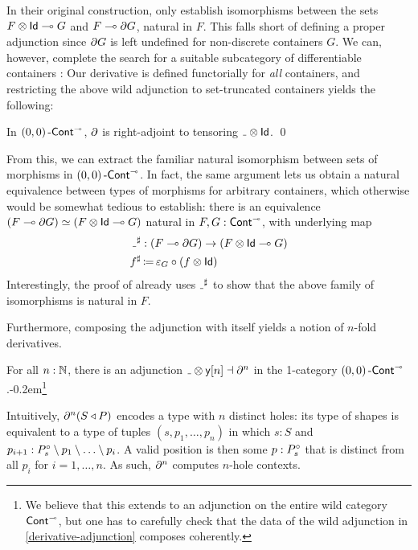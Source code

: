 In their original construction, \citeauthor{AbbottEtAl2005DataDifferentiating} only establish isomorphisms between the sets
\( F \mathbin{\otimes} \mathsf{Id}\mathrel{\multimap}G \) and \( F\mathrel{\multimap}\partial{G} \), natural in \( F \).
This falls short of defining a proper adjunction since \( \partial{G} \) is left undefined for non-discrete containers \( G \).
We can, however, complete the search for a suitable subcategory of differentiable containers \cite[14]{AbbottEtAl2005DataDifferentiating}:
Our derivative is defined functorially for \emph{all} containers,
and restricting the above wild adjunction to set-truncated containers yields the following:
\begin{theorem}\label{derivative-adjunction-sets}
  In \( (0,0)\operatorname{\mathsf{-Cont}}^{{\scriptscriptstyle\multimap}} \), \( \partial \) is right-adjoint to tensoring \( \Blank \CTimes \Id \). \qed
\end{theorem}
From this, we can extract the familiar natural isomorphism between sets of morphisms in \( (0,0)\operatorname{\mathsf{-Cont}}^{{\scriptscriptstyle\multimap}} \).
In fact, the same argument lets us obtain a natural equivalence between types of morphisms for arbitrary containers,
which otherwise would be somewhat tedious to establish:
there is an equivalence \( (F\mathrel{\multimap}\partial{G}) \simeq (F \mathbin{\otimes} \mathsf{Id}\mathrel{\multimap}G) \) natural in \( F, G : \operatorname{\operatorname{\mathsf{Cont}}}^{{\scriptscriptstyle\multimap}} \),
with underlying map
\begin{align*}
  {\Blank}^\sharp &: (\Cart{F}{\Der{G}}) \to (\Cart{\Maybe{F}}{G}) \\
  f^{\sharp} &\DefEq \varepsilon_G \circ (\Maybe{f})
\end{align*}
Interestingly, the proof of \cite[{Theorem 5.1}]{AbbottEtAl2005DataDifferentiating} already uses \( {\Blank}^{\sharp} \) to show that the above family of isomorphisms is natural in \( F \).

Furthermore, composing the adjunction with itself yields a notion of \( n \)-fold derivatives.
\begin{corollary}\label{nth-derivative-sets}
  For all \( n : \operatorname{\mathbb{N}} \), there is an adjunction \( \Blank \CTimes \CYo{[n]} \dashv \Der^n \)
  in the 1-category \( (0,0)\operatorname{\mathsf{-Cont}}^{{\scriptscriptstyle\multimap}} \).\kern-0.2em\footnote{
    We believe that this extends to an adjunction on the entire wild category \( \operatorname{\operatorname{\mathsf{Cont}}}^{{\scriptscriptstyle\multimap}} \),
    but one has to carefully check that the data of the wild adjunction in \autoref{derivative-adjunction} composes coherently.
  }
\end{corollary}
Intuitively, \( \partial^n(S\mathbin{\triangleleft}P) \) encodes a type with \( n \) distinct holes:
its type of shapes is equivalent to a type of tuples \( (s, p_1, \ldots, p_n) \)
in which \( s : S \) and \( p_{i+1} : P_s^{\circ} \setminus p_1 \setminus \ldots \setminus p_i \).
A valid position is then some \( p : P_s^{\circ} \) that is distinct from all \( p_i \) for \( i = 1, \ldots, n \).
As such, \( \partial^n \) computes \( n \)-hole contexts.

